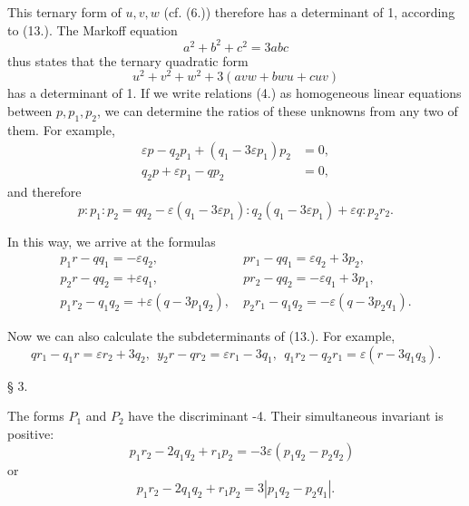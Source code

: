 \documentclass[12pt]{article}
\begin{document}
This ternary form of $u, v, w$ (cf. (6.)) therefore has a determinant of 1, according to (13.). The Markoff equation
\begin{equation*}
a^{2}+b^{2}+c^{2}=3 a b c
\end{equation*}
thus states that the ternary quadratic form
\begin{equation*}
u^{2}+v^{2}+w^{2}+3(a v w+b w u+c u v) \tag{16.}
\end{equation*}
has a determinant of 1.
If we write relations (4.) as homogeneous linear equations between $p, p_{1}, p_{2}$, we can determine the ratios of these unknowns from any two of them. For example,
\begin{align*}
\varepsilon p-q_{2} p_{1}+\left(q_{1}-3 \varepsilon p_{1}\right) p_{2} &= 0, \\
q_{2}p + \varepsilon p_{1} - q p_{2} &= 0,
\end{align*}
and therefore
\begin{equation*}
p: p_{1}: p_{2}=q q_{2}-\varepsilon\left(q_{1}-3 \varepsilon p_{1}\right): q_{2}\left(q_{1}-3 \varepsilon p_{1}\right)+\varepsilon q: p_{2} r_{2} .
\end{equation*}

In this way, we arrive at the formulas
\begin{align*}
p_{1} r-q q_{1}=-\varepsilon q_{2},\ & p r_{1}-q q_{1}=\varepsilon q_{2}+3 p_{2}, \\
p_{2} r-q q_{2}=+\varepsilon q_{1},\ & p r_{2}-q q_{2}=-\varepsilon q_{1}+3 p_{1},  \tag{17.}\\
p_{1} r_{2}-q_{1} q_{2}=+\varepsilon\left(q-3 p_{1} q_{2}\right),\ & p_{2} r_{1}-q_{1} q_{2}=-\varepsilon\left(q-3 p_{2} q_{1}\right) .
\end{align*}

Now we can also calculate the subdeterminants of (13.). For example,
\begin{equation*}
q r_{1}-q_{1} r=\varepsilon r_{2}+3 q_{2}, \ \ y_{2} r-q r_{2}=\varepsilon r_{1}-3 q_{1}, \ \ q_{1} r_{2}-q_{2} r_{1}=\varepsilon\left(r-3 q_{1} q_{3}\right). \tag{18.}
\end{equation*}

\bigskip

\centerline{§ 3.}

\bigskip

The forms $P_{1}$ and $P_{2}$ have the discriminant -4. Their simultaneous invariant is positive:
\begin{equation*}
\quad p_{1} r_{2}-2 q_{1} q_{2}+r_{1} p_{2}=-3 \varepsilon\left(p_{1} q_{2}-p_{2} q_{2}\right)  \tag{1.}
\end{equation*}
or
\begin{equation*}
p_{1} r_{2}-2 q_{1} q_{2}+r_{1} p_{2}=3\left|p_{1} q_{2}-p_{2} q_{1}\right| . \tag{2.}
\end{equation*}
\end{document}
